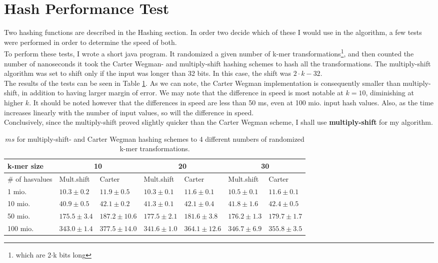 \documentclass[../../main.tex]{subfiles}
\begin{document}
\section{Hash Performance Test}

Two hashing functions are described in the Hashing section. In order two decide which of these I would use in the algorithm, a few tests were performed in order to determine the speed of both.\\

To perform these tests, I wrote a short java program. It randomized a given number of k-mer transformations\footnote{which are 2$\cdot$k bits long}, and then counted the number of nanoseconds it took the Carter Wegman- and multiply-shift hashing schemes to hash all the transformations. The multiply-shift algorithm was set to shift only if the input was longer than 32 bits. In this case, the shift was $2\cdot k - 32$.\\

The results of the tests can be seen in Table \ref{table:hashTest}. As we can note, the Carter Wegman implementation is consequently smaller than multiply-shift, in addition to having larger margin of error. We may note that the difference in speed is most notable at $k=10$, diminishing at higher $k$. It should be noted however that the differences in speed are less than 50 ms, even at 100 mio. input hash values. Also, as the time increases linearly with the number of input values, so will the difference in speed.\\

Conclusively, since the multiply-shift proved slightly quicker than the Carter Wegman scheme, I shall use {\bf multiply-shift} for my algorithm.
\begin{table}[h]
\begin{tabular}{| l | l | l | l | l | l | l |}
\hline
k-mer size & \multicolumn{2}{c|}{10} & \multicolumn{2}{c|}{20} & \multicolumn{2}{c|}{30} \\
\hline
\# of hasvalues & Mult.shift & Carter & Mult.shift & Carter & Mult.shift & Carter \\
 \hline
1 mio. & $10.3\pm 0.2$ & $11.9\pm 0.5$ & $10.3\pm 0.1$ & $11.6\pm 0.1$ & $10.5\pm 0.1$ & $11.6\pm 0.1$\\
10 mio. & $40.9\pm 0.5$ & $42.1\pm0.2$ & $41.3\pm 0.1$ & $42.1\pm0.4$ & $41.8\pm 1.6$ & $42.4\pm0.5$\\
50 mio. & $175.5\pm3.4$ & $187.2\pm 10.6$ & $177.5\pm2.1$  & $181.6\pm3.8$ & $176.2\pm1.3$ & $179.7\pm1.7$\\
100 mio. & $343.0\pm1.4$ & $377.5\pm14.0$ & $341.6\pm1.0$ & $364.1\pm12.6$ & $346.7\pm6.9$ & $355.8\pm3.5$\\
\hline
\end{tabular}
\caption{$ms$ for multiply-shift- and Carter Wegman hashing schemes to 4 different numbers of randomized k-mer transformations.}
\label{table:hashTest}
\end{table}
\end{document}

